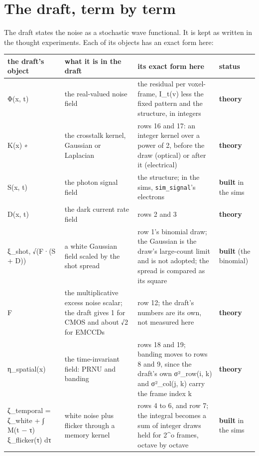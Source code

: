 \section{\texorpdfstring{The draft, term by term}{The draft, term by term}}

The draft states the noise as a stochastic wave functional. It is kept as written in the thought experiments. Each of its objects has an exact form here:

{\footnotesize
\setlength{\tabcolsep}{6pt}
\begin{longtable}{>{\RaggedRight\arraybackslash}p{}>{\RaggedRight\arraybackslash}p{}>{\RaggedRight\arraybackslash}p{}>{\RaggedRight\arraybackslash}p{}}
\toprule
the draft's object & what it is in the draft & its exact form here & status \\
\midrule
\endhead
Φ(x, t) & the real-valued noise field & the residual per voxel-frame, I\_\allowbreak{}t(v) less the fixed pattern and the structure, in integers & \textbf{theory} \\
K(x) ∗ & the crosstalk kernel, Gaussian or Laplacian & rows 16 and 17: an integer kernel over a power of 2, before the draw (optical) or after it (electrical) & \textbf{theory} \\
S(x, t) & the photon signal field & the structure; in the sims, \texttt{sim\_\allowbreak{}signal}'s electrons & \textbf{built} in the sims \\
D(x, t) & the dark current rate field & rows 2 and 3 & \textbf{theory} \\
ξ\_\allowbreak{}shot, √(F·(S + D)) & a white Gaussian field scaled by the shot spread & row 1's binomial draw; the Gaussian is the draw's large-count limit and is not adopted; the spread is compared as its square & \textbf{built} (the binomial) \\
F & the multiplicative excess noise scalar; the draft gives 1 for CMOS and about √2 for EMCCDs & row 12; the draft's numbers are its own, not measured here & \textbf{theory} \\
η\_\allowbreak{}spatial(x) & the time-invariant field: PRNU and banding & rows 18 and 19; banding moves to rows 8 and 9, since the draft's own σ²\_\allowbreak{}row(i, k) and σ²\_\allowbreak{}col(j, k) carry the frame index k & \textbf{theory} \\
ζ\_\allowbreak{}temporal = ζ\_\allowbreak{}white + ∫ M(t − τ) ξ\_\allowbreak{}flicker(τ) dτ & white noise plus flicker through a memory kernel & rows 4 to 6, and row 7; the integral becomes a sum of integer draws held for 2\textasciicircum{}o frames, octave by octave & \textbf{built} in the sims \\

\end{longtable}}
